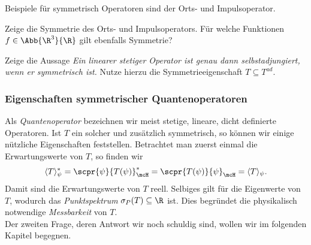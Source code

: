 \documentclass{subfiles}
\begin{document}
        Beispiele für symmetrisch Operatoren sind der Orts- und Impulsoperator.
        \begin{Aufgabe}
            \nr{} Zeige die Symmetrie des Orts- und Impulsoperators. Für welche Funktionen $f\in\Abb{\R^3}{\R}$ gilt ebenfalls Symmetrie?
            
            \nr{} Zeige die Aussage \textit{Ein linearer stetiger Operator ist genau dann selbstadjungiert, wenn er symmetrisch ist.} Nutze hierzu die Symmetrieeigenschaft $T\subseteq T^{\textit{ad}}$. 
        \end{Aufgabe}
    \subsubsection*{Eigenschaften symmetrischer Quantenoperatoren}
        Als \emph{Quantenoperator} bezeichnen wir meist stetige, lineare, dicht definierte Operatoren. Ist $T$ ein solcher und zusätzlich symmetrisch, so können wir einige nützliche Eigenschaften feststellen. Betrachtet man zuerst einmal die Erwartungswerte von $T$, so finden wir 
        \[\langle T\rangle_\psi^* = \scpr{\psi}{T(\psi)}_\mcH^* = \scpr{T(\psi)}{\psi}_\mcH = \langle T\rangle_\psi.\]
        Damit sind die Erwartungswerte von $T$ reell. Selbiges gilt für die Eigenwerte von $T$, wodurch das \emph{Punktspektrum} $\sigma_P(T)\subseteq\R$ ist. Dies begründet die physikalisch notwendige \emph{Messbarkeit} von $T$. \\

        Der zweiten Frage, deren Antwort wir noch schuldig sind, wollen wir im folgenden Kapitel begegnen. 
\end{document}
